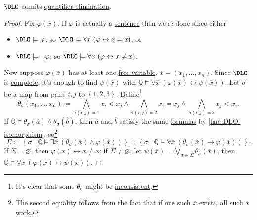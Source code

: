 \begin{theorem}\label{thm:DLO-QE}
	\(\DLO\) admits \hyperref[def:quantifier-elimination]{quantifier elimination}.
\end{theorem}
\begin{proof}
	Fix \(\varphi (\overline{x} )\). If \(\varphi \) is actually a \hyperref[def:sentence]{sentence} then we're done since either
	\begin{itemize}
		\item \(\DLO \models \varphi \), so \(\DLO \models \forall x\ (\varphi \leftrightarrow x = x)\), or
		\item \(\DLO \models \lnot \varphi \), so \(\DLO \models \forall x\ (\varphi \leftrightarrow x \neq x)\).
	\end{itemize}
	Now suppose \(\varphi (\overline{x} )\) has at least one \hyperref[def:free-variable]{free variable}, \(\overline{x} = (x_1, \ldots , x_n)\). Since \(\DLO\) is \hyperref[def:theory-complete]{complete}, it's enough to find \(\psi (\overline{x} )\) with \(\mathbb{Q} \models \forall \overline{x} \ (\varphi (\overline{x} ) \leftrightarrow \psi (\overline{x} ))\). Let \(\sigma \) be a map from pairs \(i, j\) to \(\left\{ 1, 2, 3 \right\} \). Define\footnote{It's clear that some \(\theta _\sigma \) might be \hyperref[def:inconsistent]{inconsistent}.}
	\[
		\theta _\sigma (x_1, \ldots , x_n) \coloneqq \bigwedge_{\sigma (i, j) = 1} x_i < x_j \land \bigwedge_{\sigma (i, j)=2} x_i = x_j \land \bigwedge_{\sigma (i, j)=3} x_j < x_i.
	\]
	If \(\mathbb{Q} \models \theta _\sigma (\overline{a} ) \land \theta _\sigma (\overline{b} )\), then \(\overline{a} \) and \(\overline{b} \) satisfy the same \hyperref[def:formula]{formulas} by \autoref{lma:DLO-isomorphism}, so\footnote{The second equality follows from the fact that if one such \(\overline{x} \) exists, all such \(\overline{x} \) work.}
	\[
		\Sigma
		\coloneqq \left\{ \sigma \mid \mathbb{Q} \models \exists \overline{x}\ (\theta _\sigma (\overline{x} ) \land \varphi (\overline{x} )) \right\}
		= \left\{ \sigma \mid \mathbb{Q} \models \forall \overline{x}\ (\theta _\sigma (\overline{x} ) \to \varphi (\overline{x} )) \right\}.
	\]
	If \(\Sigma = \varnothing \), then \(\varphi (x) \leftrightarrow x \neq x\); if \(\Sigma \neq \varnothing \), let \(\psi (\overline{x} ) = \bigvee_{\sigma \in \Sigma } \theta _\sigma (\overline{x} ) \), then \(\mathbb{Q} \models \forall \overline{x} \ (\varphi (\overline{x} ) \leftrightarrow \psi (\overline{x} ))\).
\end{proof}